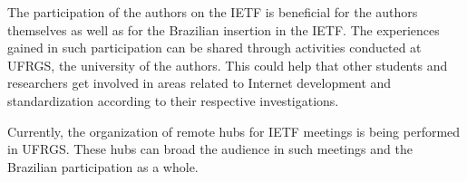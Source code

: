\documentclass[12pt]{article}
\begin{document}
The participation of the authors on the IETF is beneficial for the authors themselves as well as for the Brazilian insertion in the IETF. The experiences gained in such participation can be shared through activities conducted at UFRGS, the university of the authors. This could help that other students and researchers get involved in areas related to Internet development and standardization according to their respective investigations.

%

Currently, the organization of remote hubs for IETF meetings is being performed in UFRGS. These hubs can broad the audience in such meetings and the Brazilian participation as a whole.



\end{document}
